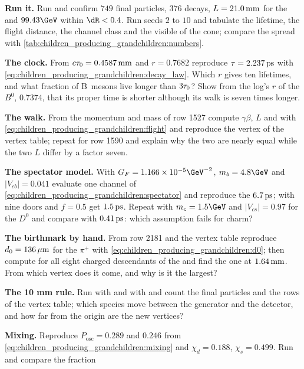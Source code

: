 \begin{exercises}
\item \textbf{Run it.} Run  and confirm
  $749$ final particles, $376$ decays, $L=21.0\,\mathrm{mm}$ for the \Bbar and
  $99.43\GeV$ within $\dR<0.4$. Run seeds $2$ to $10$ and tabulate the
  lifetime, the flight distance, the channel class and the visible \pt of
  the cone; compare the spread with
  \cref{tab:children_producing_grandchildren:numbers}.
\item \textbf{The clock.} From $c\tau_0=0.4587\,\mathrm{mm}$ and $r=0.7682$ reproduce
  $\tau=2.237\,\mathrm{ps}$ with \cref{eq:children_producing_grandchildren:decay_law}.
  Which $r$ gives ten lifetimes, and what fraction of B~mesons live
  longer than $3\tau_0$? Show from the log's $r$ of the $B^0$, $0.7374$,
  that its proper time is shorter although its walk is seven times
  longer.
\item \textbf{The walk.} From the momentum and mass of row 1527 compute
  $\gamma\beta$, $L$ and \Lxy with
  \cref{eq:children_producing_grandchildren:flight} and reproduce the
  vertex of the vertex table; repeat for row 1590 and explain why the two
  \Lxy are nearly equal while the two $L$ differ by a factor seven.
\item \textbf{The spectator model.} With $G_F=1.166\times10^{-5}\GeV^{-2}$,
  $m_b=4.8\GeV$ and $|V_{cb}|=0.041$ evaluate one channel of
  \cref{eq:children_producing_grandchildren:spectator} and reproduce the
  $6.7\,\mathrm{ps}$; with nine doors and $f=0.5$ get $1.5\,\mathrm{ps}$. Repeat with
  $m_c=1.5\GeV$ and $|V_{cs}|=0.97$ for the $D^0$ and compare with
  $0.41\,\mathrm{ps}$: which assumption fails for charm?
\item \textbf{The birthmark by hand.} From row 2181 and the vertex table
  reproduce $d_0=136\,\mu\mathrm{m}$ for the $\pi^+$ with
  \cref{eq:children_producing_grandchildren:d0}; then compute \dzero for
  all eight charged descendants of the \Bbar and find the one at
  $1.64\,\mathrm{mm}$. From which vertex does it come, and why is it the largest?
\item \textbf{The 10 mm rule.} Run with  and with
   and count the final particles and the rows of the
  vertex table; which species move between the generator and the
  detector, and how far from the origin are the new vertices?
\item \textbf{Mixing.} Reproduce $P_{\mathrm{osc}}=0.289$ and $0.246$
  from \cref{eq:children_producing_grandchildren:mixing} and $\chi_d=0.188$,
  $\chi_s=0.499$. Run  and compare the fraction

\end{exercises}
